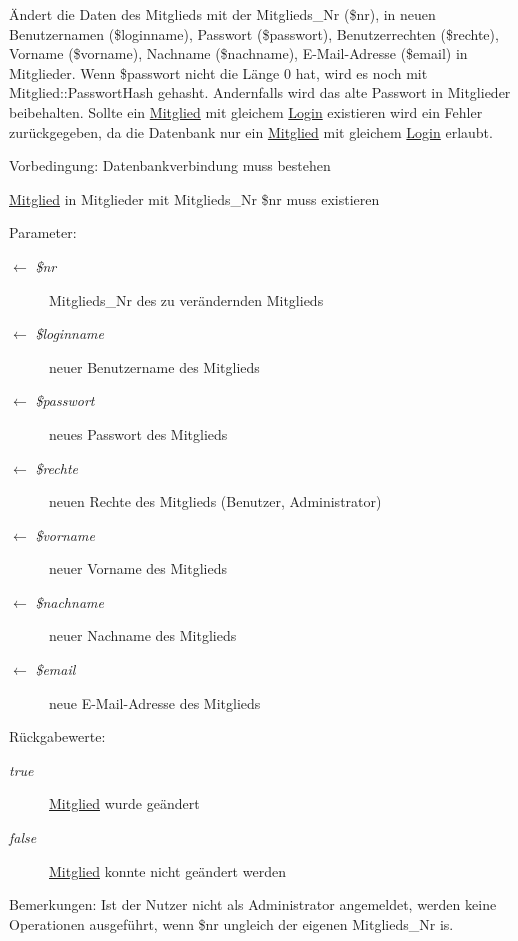 Ändert die Daten des Mitglieds mit der Mitglieds\_\-Nr (\$nr), in neuen Benutzernamen (\$loginname), Passwort (\$passwort), Benutzerrechten (\$rechte), Vorname (\$vorname), Nachname (\$nachname), E-Mail-Adresse (\$email) in Mitglieder. Wenn \$passwort nicht die Länge 0 hat, wird es noch mit Mitglied::Passwort\-Hash gehasht. Andernfalls wird das alte Passwort in Mitglieder beibehalten. Sollte ein \hyperlink{classMitglied}{Mitglied} mit gleichem \hyperlink{classLogin}{Login} existieren wird ein Fehler zurückgegeben, da die Datenbank nur ein \hyperlink{classMitglied}{Mitglied} mit gleichem \hyperlink{classLogin}{Login} erlaubt. \begin{Desc}
\item[Vorbedingung:]Datenbankverbindung muss bestehen 

\hyperlink{classMitglied}{Mitglied} in Mitglieder mit Mitglieds\_\-Nr \$nr muss existieren \end{Desc}
\begin{Desc}
\item[Parameter:]
\begin{description}
\item[\mbox{$\leftarrow$} {\em \$nr}]Mitglieds\_\-Nr des zu verändernden Mitglieds \item[\mbox{$\leftarrow$} {\em \$loginname}]neuer Benutzername des Mitglieds \item[\mbox{$\leftarrow$} {\em \$passwort}]neues Passwort des Mitglieds \item[\mbox{$\leftarrow$} {\em \$rechte}]neuen Rechte des Mitglieds (Benutzer, Administrator) \item[\mbox{$\leftarrow$} {\em \$vorname}]neuer Vorname des Mitglieds \item[\mbox{$\leftarrow$} {\em \$nachname}]neuer Nachname des Mitglieds \item[\mbox{$\leftarrow$} {\em \$email}]neue E-Mail-Adresse des Mitglieds \end{description}
\end{Desc}
\begin{Desc}
\item[R\"{u}ckgabewerte:]
\begin{description}
\item[{\em true}]\hyperlink{classMitglied}{Mitglied} wurde geändert \item[{\em false}]\hyperlink{classMitglied}{Mitglied} konnte nicht geändert werden \end{description}
\end{Desc}
\begin{Desc}
\item[Bemerkungen:]Ist der Nutzer nicht als Administrator angemeldet, werden keine Operationen ausgeführt, wenn \$nr ungleich der eigenen Mitglieds\_\-Nr is. \end{Desc}


